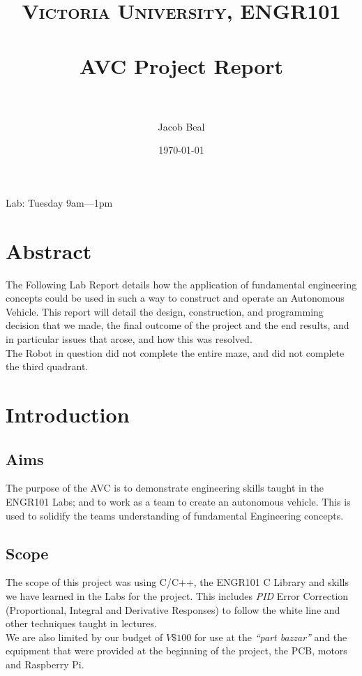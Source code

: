 \documentclass[paper=a4, fontsize=11pt]{scrartcl} %
\title{
\normalfont\normalsize
\textsc{Victoria University, ENGR101} \\ [25pt] %
\horrule{0.5pt} \\[0.4cm] %
\huge AVC Project Report\\ %
\horrule{2pt} \\[0.5cm] %
}
\author{Jacob Beal} %
\date{\normalsize\today} %
\numberwithin{equation}{section} %
\numberwithin{figure}{section} %
\begin{document}
\maketitle
\begin{center}
  Lab: Tuesday 9am---1pm\\
\end{center}
\pagebreak
\tableofcontents
\pagebreak

\section{Abstract}
The Following Lab Report details how the application of fundamental engineering
concepts could be used in such a way to construct and operate an Autonomous
Vehicle. This report will detail the design, construction, and programming
decision that we made, the final outcome of the project and the end results,
and in particular issues that arose, and how this was resolved.\\

The Robot in question did not complete the entire maze, and did not complete the
third quadrant.





\section{Introduction}
\subsection{Aims}
The purpose of the AVC is to demonstrate engineering skills taught in the
ENGR101 Labs; and to work as a team to create an autonomous vehicle. This is
used to solidify the teams understanding of fundamental Engineering concepts.
\subsection{Scope}
The scope of this project was using C/C++, the ENGR101 C Library and skills we
have learned in the Labs for the project. This includes \textit{PID} Error
Correction (Proportional, Integral and Derivative Responses) to follow the 
white line and other techniques taught in lectures.\\
We are also limited by our budget of $V\$100$ for use at the \textit{``part
bazzar''} and the equipment that were provided at the beginning of the
project, the PCB, motors and Raspberry Pi.
\end{document}
